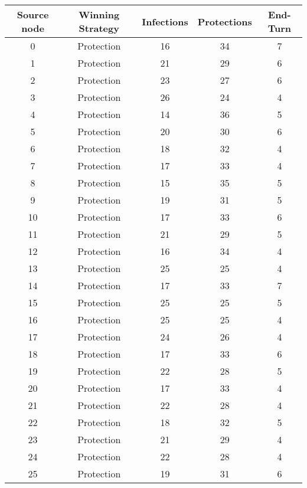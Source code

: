 \documentclass[results.tex]{subfiles}
\begin{document}
\begin{center}
  \begin{tabular}{| c || c | c | c | c |}
    \hline
    {\bfseries Source node} & {\bfseries Winning Strategy} & {\bfseries Infections} & {\bfseries Protections} & {\bfseries End-Turn} \\  %
    \hline\hline
    0 & Protection & 16 & 34 & 7 \\ 
    \hline
    1 & Protection & 21 & 29 & 6 \\ 
    \hline
    2 & Protection & 23 & 27 & 6 \\ 
    \hline
    3 & Protection & 26 & 24 & 4 \\ 
    \hline
    4 & Protection & 14 & 36 & 5 \\ 
    \hline
    5 & Protection & 20 & 30 & 6 \\ 
    \hline
    6 & Protection & 18 & 32 & 4 \\ 
    \hline
    7 & Protection & 17 & 33 & 4 \\ 
    \hline
    8 & Protection & 15 & 35 & 5 \\ 
    \hline
    9 & Protection & 19 & 31 & 5 \\ 
    \hline
    10 & Protection & 17 & 33 & 6 \\ 
    \hline
    11 & Protection & 21 & 29 & 5 \\ 
    \hline
    12 & Protection & 16 & 34 & 4 \\ 
    \hline
    13 & Protection & 25 & 25 & 4 \\ 
    \hline
    14 & Protection & 17 & 33 & 7 \\ 
    \hline
    15 & Protection & 25 & 25 & 5 \\ 
    \hline
    16 & Protection & 25 & 25 & 4 \\ 
    \hline
    17 & Protection & 24 & 26 & 4 \\ 
    \hline
    18 & Protection & 17 & 33 & 6 \\ 
    \hline
    19 & Protection & 22 & 28 & 5 \\ 
    \hline
    20 & Protection & 17 & 33 & 4 \\ 
    \hline
    21 & Protection & 22 & 28 & 4 \\ 
    \hline
    22 & Protection & 18 & 32 & 5 \\ 
    \hline
    23 & Protection & 21 & 29 & 4 \\ 
    \hline
    24 & Protection & 22 & 28 & 4 \\ 
    \hline
    25 & Protection & 19 & 31 & 6 \\ 

\end{tabular}
\end{center}
\end{document}
